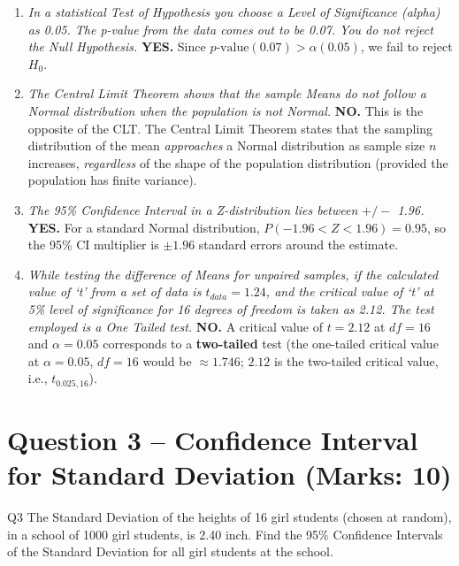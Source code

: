 \documentclass[11pt]{article}
\begin{document}
\begin{enumerate}[label=(\roman*)]
\item \textit{In a statistical Test of Hypothesis you choose a Level of Significance (alpha) as 0.05. The p-value from the data comes out to be 0.07. You do not reject the Null Hypothesis.}
\textbf{YES.} Since $p\text{-value} (0.07) > \alpha (0.05)$, we fail to reject $H_0$.

\item \textit{The Central Limit Theorem shows that the sample Means do not follow a Normal distribution when the population is not Normal.}
\textbf{NO.} This is the opposite of the CLT. The Central Limit Theorem states that the sampling distribution of the mean \emph{approaches} a Normal distribution as sample size $n$ increases, \emph{regardless} of the shape of the population distribution (provided the population has finite variance).

\item \textit{The 95\% Confidence Interval in a Z-distribution lies between $+/-$ 1.96.}
\textbf{YES.} For a standard Normal distribution, $P(-1.96 < Z < 1.96) = 0.95$, so the 95\% CI multiplier is $\pm 1.96$ standard errors around the estimate.

\item \textit{While testing the difference of Means for unpaired samples, if the calculated value of `t' from a set of data is $t_{data} = 1.24$, and the critical value of `t' at 5\% level of significance for 16 degrees of freedom is taken as 2.12. The test employed is a One Tailed test.}
\textbf{NO.} A critical value of $t=2.12$ at $df=16$ and $\alpha=0.05$ corresponds to a \textbf{two-tailed} test (the one-tailed critical value at $\alpha=0.05$, $df=16$ would be $\approx 1.746$; $2.12$ is the two-tailed critical value, i.e., $t_{0.025,16}$).

\end{enumerate}

\section{Question 3 -- Confidence Interval for Standard Deviation (Marks: 10)}
\begin{question}{Q3}
The Standard Deviation of the heights of 16 girl students (chosen at random), in a school of 1000 girl students, is 2.40 inch. Find the 95\% Confidence Intervals of the Standard Deviation for all girl students at the school.
\end{question}
\end{document}
